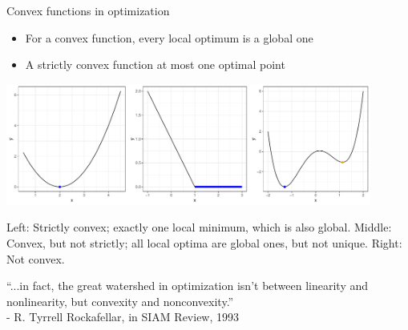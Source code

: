 \documentclass[11pt,compress,t,notes=noshow, xcolor=table]{beamer}
\begin{document}
\begin{vbframe}{Convex functions in optimization}
  

  \begin{itemize}
    \item For a convex function, every local optimum is a global one  
    \item A strictly convex function at most one optimal point
  \end{itemize}
  
  \begin{center}
  \includegraphics[width = 0.9\textwidth]{figure_man/convexity_3.pdf} \\
  \begin{footnotesize}
  Left: Strictly convex; exactly one local minimum, which is also global. Middle: Convex, but not strictly; all local optima are global ones, but not unique. Right: Not convex.
  \end{footnotesize} 
  \end{center}
  
\framebreak 

\vspace*{2cm}

\begin{center}
\Large{\enquote{...in fact, the great watershed in optimization isn't between linearity and nonlinearity, but convexity and nonconvexity.}}\\
\normalsize - R. Tyrrell Rockafellar, in SIAM Review, 1993
\end{center}

	
\end{vbframe}

\endlecture
\end{document}
